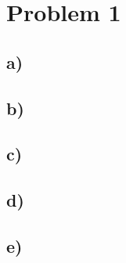 
\section*{Problem 1}
\subsection*{a)}
\subsection*{b)}
\subsection*{c)}
\subsection*{d)}
\subsection*{e)}